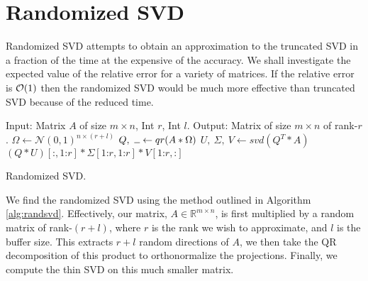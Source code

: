 \documentclass[11pt, a4paper, twocolumn]{article}
\let\originalleft\left
\let\originalright\right
\renewcommand{\left}{\mathopen{}\mathclose\bgroup\originalleft}
\renewcommand{\right}{\aftergroup\egroup\originalright}
\providecommand{\bigO}[1]{\ensuremath{\mathop{}\mathopen{}\mathcal{O}\mathopen{}\left(#1\right)}}
\begin{document}
\section{Randomized SVD}
\label{sec:randsvd}
Randomized SVD attempts to obtain an approximation to the truncated SVD in a fraction of the time at the expensive of the accuracy. We shall investigate the expected value of the relative error for a variety of matrices. If the relative error is $\bigO{1}$ then the randomized SVD would be much more effective than truncated SVD because of the reduced time.

\begin{algorithm}[tbp]
    \begin{algorithmic}[1]
        \State Input: Matrix $A$ of size $m \times n$, Int $r$, Int $l$.
        \State Output: Matrix of size $m \times n$ of rank-$r$.
        \State \hspace{\algorithmicindent} $\Omega \gets \mathcal{N}(0, 1)^{n \times (r + l)}$ \label{alg:omega}
        \State \hspace{\algorithmicindent} $Q, \ \rule{2mm}{0.15mm} \gets qr(A * \Omega)$ \label{alg:qr}
        \State \hspace{\algorithmicindent} $U, \ \Sigma, \ V \gets svd(Q^T * A)$ \\ \label{alg:svd}
        \Return $(Q * U)[\text{:}, 1\text{:}r] * \Sigma[1 \text{:} r, 1 \text{:} r] * V[1 \text{:} r,\text{:}]$
    \end{algorithmic}
    \caption{Randomized SVD.}
    \label{alg:randsvd}
\end{algorithm}

We find the randomized SVD using the method outlined in Algorithm \ref{alg:randsvd}. Effectively, our matrix, $A \in \mathbb{R}^{m \times n}$, is first multiplied by a random matrix of rank-$(r + l)$, where $r$ is the rank we wish to approximate, and $l$ is the buffer size. This extracts $r + l$ random directions of $A$, we then take the QR decomposition of this product to orthonormalize the projections. Finally, we compute the thin SVD on this much smaller matrix.
\end{document}
